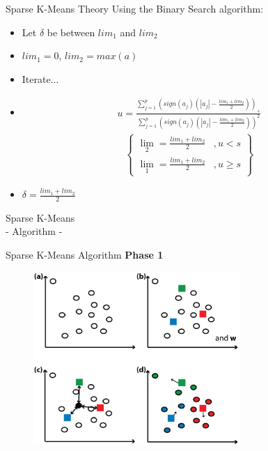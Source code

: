 \documentclass{beamer}
\newlength{\tmpShadow}
\newcommand{\MyShadow}[2]{%
	\settowidth{\tmpShadow}{#1}
	\addtolength{\tmpShadow}{.1em}
	\raisebox{-0.25ex}{\textcolor{gray!70}{#1}}%
	\kern-\tmpShadow%
	\textcolor{#2}{#1}%
}
\begin{document}
{\begin{frame}{Sparse K-Means Theory}
	Using the Binary Search algorithm:
	\vspace{3mm}
	\begin{itemize}[label={\MyShadow{$\bullet$}{blue!80}}]
		\item Let $\delta$ be between $lim_1$ and $lim_2$
		\vspace{3mm}
		\item $lim_1 = 0$, $lim_2 = max(a)$
		\vspace{3mm}
		\item Iterate...
		\item[]
			\begin{align}\nonumber
				u = \frac{ \sum_{j=1}^p (sign(a_{j})(|a_{j}|-\frac{lim_1+lim_2}{2}))_+ } {\sum_{j=1}^p (sign(a_{j})(|a_{j}|-\frac{lim_1+lim_2}{2}))^2}
			\end{align}
			\begin{align}\nonumber
				\begin{Bmatrix}
					\lim_2 = \frac{lim_1+lim_2}{2} &, u < s \\ 
					\lim_1 = \frac{lim_1+lim_2}{2} &, u \geq s
				\end{Bmatrix}
			\end{align}
		\vspace{3mm}
		\item $\delta = \frac{lim_1+lim_2}{2}$
	\end{itemize}
\end{frame}	

\begin{frame}[plain,c]
	\begin{center}
		\Huge Sparse K-Means\\
		\Huge - Algorithm -
	\end{center}
\end{frame}

\begin{frame}{Sparse K-Means Algorithm}
	\textbf{Phase 1}\\
	\begin{figure}[H]
		\centering
		\includegraphics[width=0.7\textwidth]{figures/skm1}
	\end{figure}
\end{frame}

}
\end{document}
